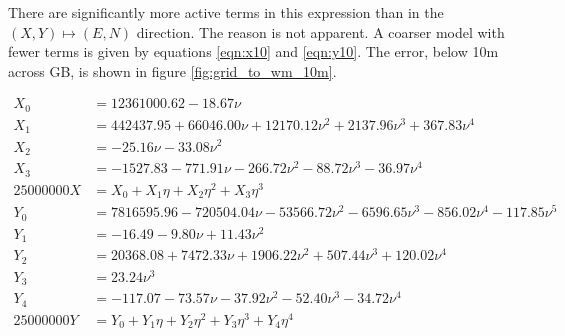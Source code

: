 \documentclass[10pt,a4paper]{article}
\begin{document}
There are significantly more active terms in this expression than in the $(X,Y)
\mapsto (E, N)$ direction.  The reason is not apparent.  A coarser model
with fewer terms is given by equations \eqref{eqn:x10} and \eqref{eqn:y10}.
The error, below 10m across GB, is shown in figure \ref{fig:grid_to_wm_10m}.

\begin{align}
X_0 &= 12361000.62 -18.67\nu\nonumber \\
X_1 &= 442437.95 +66046.00\nu +12170.12\nu^2 +2137.96\nu^3 +367.83\nu^4\nonumber \\
X_2 &= -25.16\nu -33.08\nu^2\nonumber \\
X_3 &= -1527.83 -771.91\nu -266.72\nu^2 -88.72\nu^3 -36.97\nu^4\nonumber \\
25000000 X &= X_0 +X_1\eta +X_2\eta^2 +X_3\eta^3
  \label{eqn:x10}
\\[1ex]
Y_0 &= 7816595.96 -720504.04\nu -53566.72\nu^2 -6596.65\nu^3 -856.02\nu^4 -117.85\nu^5\nonumber \\
Y_1 &= -16.49 -9.80\nu +11.43\nu^2\nonumber \\
Y_2 &= 20368.08 +7472.33\nu +1906.22\nu^2 +507.44\nu^3 +120.02\nu^4\nonumber \\
Y_3 &= 23.24\nu^3\nonumber \\
Y_4 &= -117.07 -73.57\nu -37.92\nu^2 -52.40\nu^3 -34.72\nu^4\nonumber \\
25000000 Y &= Y_0 +Y_1\eta +Y_2\eta^2 +Y_3\eta^3 +Y_4\eta^4
  \label{eqn:y10}
\end{align}
\end{document}
